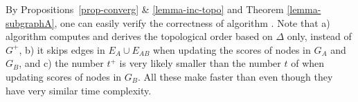 
By Propositions~\ref{prop-converg} \& \ref{lemma-inc-topo} and Theorem \ref{lemma-subgraphA}, one can easily verify the correctness of algorithm \inctwprscc.
%
Note that  a) algorithm \inctwprscc computes \sccs and derives the topological order based  on $\Delta$ only, instead of $G^{+}$,
b) it skips edges in $E_A\cup E_{AB}$ when updating the scores of nodes in $G_A$ and $G_B$, and
c) the number $t^+$ is very likely smaller than the number $t$ of \twprscc when updating scores of nodes in $G_B$.
%
All these make \inctwprscc faster than \twprscc even though they have very similar time complexity.



